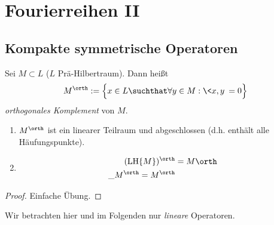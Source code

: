 
\chapter{Fourierreihen II}

\section{Kompakte symmetrische Operatoren}


\begin{df} \label{3.1}
	Sei $M \subset L$ ($L$ Prä-Hilbertraum).
	Dann heißt
	\[
		M^\orth := \Big\{ x \in L \suchthat \forall y \in M : \<x,y\> = 0 \Big\}
	\]
	\emph{orthogonales Komplement} von $M$.
\end{df}

\begin{st} \label{3.2}
	\begin{enumerate}[1)]
		\item
			$M^\orth$ ist ein linearer Teilraum und abgeschlossen (d.h. enthält alle Häufungspunkte).
		\item
			\begin{align*}
				(\LH \{M\})^\orth &= M\orth \\
				\_M^\orth = M^\orth
			\end{align*}
	\end{enumerate}
	\begin{proof}
		Einfache Übung.
	\end{proof}
\end{st}

\begin{conv*}
	Wir betrachten hier und im Folgenden nur \emph{lineare} Operatoren.
\end{conv*}

